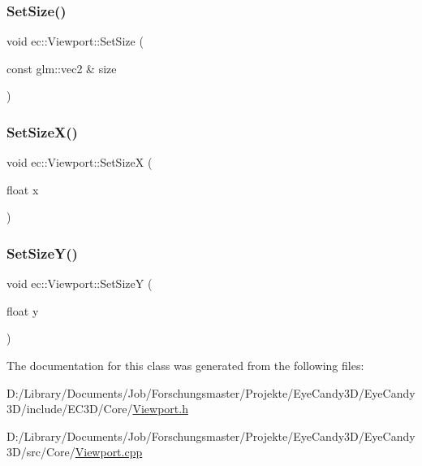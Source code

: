 \mbox{\label{classec_1_1_viewport_a9e8bd48f0bb12b8a45502d766d6e1b76}} 
\subsubsection{\texorpdfstring{Set\+Size()}{SetSize()}}
{\footnotesize\ttfamily void ec\+::\+Viewport\+::\+Set\+Size (\begin{DoxyParamCaption}\item[{const glm\+::vec2 \&}]{size }\end{DoxyParamCaption})}

\mbox{\label{classec_1_1_viewport_a8bee5a207bb2919c04624aa7b9d3af34}} 
\subsubsection{\texorpdfstring{Set\+Size\+X()}{SetSizeX()}}
{\footnotesize\ttfamily void ec\+::\+Viewport\+::\+Set\+SizeX (\begin{DoxyParamCaption}\item[{float}]{x }\end{DoxyParamCaption})}

\mbox{\label{classec_1_1_viewport_aca8b10d6c70358e579980c7a32efd21c}} 
\subsubsection{\texorpdfstring{Set\+Size\+Y()}{SetSizeY()}}
{\footnotesize\ttfamily void ec\+::\+Viewport\+::\+Set\+SizeY (\begin{DoxyParamCaption}\item[{float}]{y }\end{DoxyParamCaption})}



The documentation for this class was generated from the following files\+:\begin{DoxyCompactItemize}
\item 
D\+:/\+Library/\+Documents/\+Job/\+Forschungsmaster/\+Projekte/\+Eye\+Candy3\+D/\+Eye\+Candy3\+D/include/\+E\+C3\+D/\+Core/\mbox{\hyperlink{_viewport_8h}{Viewport.\+h}}\item 
D\+:/\+Library/\+Documents/\+Job/\+Forschungsmaster/\+Projekte/\+Eye\+Candy3\+D/\+Eye\+Candy3\+D/src/\+Core/\mbox{\hyperlink{_viewport_8cpp}{Viewport.\+cpp}}\end{DoxyCompactItemize}
